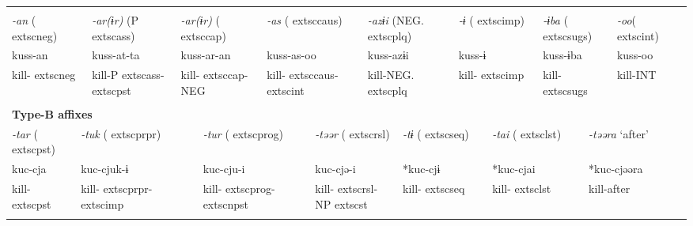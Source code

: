 \tabletail{}
\tablelasttail{}
\begin{tabularx}{\textwidth}{XXm{}XXXXXXXXXXXXXXXXXXXX}
\lsptoprule
\multicolumn{23}{X}{{\bfseries Type-A affixes}}\\
\multicolumn{3}{X}{{ \textit{{}-an} (	extsc{neg})}} & \multicolumn{3}{X}{{ \textit{{}-ar(ɨr)} (P	extsc{ass})}} & \multicolumn{4}{X}{{ \textit{{}-ar(ɨr)} (	extsc{cap})}} & \multicolumn{4}{X}{{ \textit{{}-as} (	extsc{caus})}} & \multicolumn{3}{X}{{ \textit{{}-azɨi} (NEG.	extsc{plq})}} & \multicolumn{2}{X}{{ \textit{{}-ɨ} (	extsc{imp})}} & \multicolumn{2}{X}{{ \textit{{}-ɨba} (	extsc{sugs})}} & { \textit{{}-oo}(	extsc{int})} & \\
\multicolumn{3}{X}{{ kuss-an}} & \multicolumn{3}{X}{{ kuss-at-ta}} & \multicolumn{4}{X}{{ kuss-ar-an}} & \multicolumn{4}{X}{{ kuss-as-oo}} & \multicolumn{3}{X}{{ kuss-azɨi}} & \multicolumn{2}{X}{{ kuss-ɨ}} & \multicolumn{2}{X}{{ kuss-ɨba}} & { kuss-oo} & \\
\multicolumn{3}{X}{kill-	extsc{neg}} & \multicolumn{3}{X}{kill-P	extsc{ass}-	extsc{pst}} & \multicolumn{4}{X}{kill-	extsc{cap}-NEG} & \multicolumn{4}{X}{kill-	extsc{caus}-	extsc{int}} & \multicolumn{3}{X}{kill-NEG.	extsc{plq}} & \multicolumn{2}{X}{kill-	extsc{imp}} & \multicolumn{2}{X}{kill-	extsc{sugs}} & kill-INT & \\
\multicolumn{23}{X}{}\\
\multicolumn{23}{X}{{\bfseries Type-B affixes}}\\
\multicolumn{2}{X}{{ \textit{{}-tar} (	extsc{pst})}} & \multicolumn{6}{X}{{ \textit{{}-tuk} (	extsc{prpr})}} & \multicolumn{3}{X}{{ \textit{{}-tur} (	extsc{prog})}} & \multicolumn{4}{X}{{ \textit{{}-təər} (	extsc{rsl})}} & \multicolumn{3}{X}{{ \textit{{}-tɨ} (	extsc{seq})}} & \multicolumn{2}{X}{{ \textit{{}-tai} (	extsc{lst})}} & \multicolumn{3}{X}{{ \textit{{}-təəra} ‘after’}}\\
\multicolumn{2}{X}{{ kuc-cja}} & \multicolumn{6}{X}{{ kuc-cjuk-ɨ}} & \multicolumn{3}{X}{{ kuc-cju-i}} & \multicolumn{4}{X}{{ kuc-cjə-i}} & \multicolumn{3}{X}{{ *kuc-cjɨ}} & \multicolumn{2}{X}{{ *kuc-cjai}} & \multicolumn{3}{X}{{ *kuc-cjəəra}}\\
\multicolumn{2}{X}{kill-	extsc{pst}} & \multicolumn{6}{X}{kill-	extsc{prpr}-	extsc{imp}} & \multicolumn{3}{X}{kill-	extsc{prog}-	extsc{npst}} & \multicolumn{4}{X}{kill-	extsc{rsl}-NP	extsc{st}} & \multicolumn{3}{X}{kill-	extsc{seq}} & \multicolumn{2}{X}{kill-	extsc{lst}} & \multicolumn{3}{X}{{ kill-after}}\\
\multicolumn{2}{X}{} & \multicolumn{6}{X}{} & \multicolumn{3}{X}{} & \multicolumn{4}{X}{} & \multicolumn{3}{X}{} & \multicolumn{2}{X}{} & \multicolumn{3}{X}{}\\

\end{tabularx}
